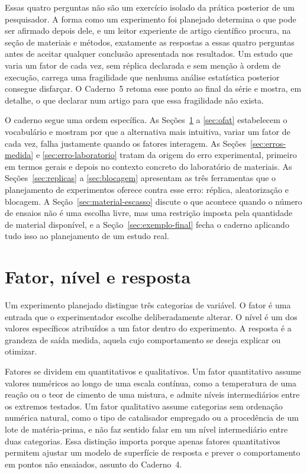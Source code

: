 \documentclass{doeapostila}
\begin{document}
Essas quatro perguntas não são um exercício isolado da prática posterior de
um pesquisador. A forma como um experimento foi planejado determina o que
pode ser afirmado depois dele, e um leitor experiente de artigo científico
procura, na seção de materiais e métodos, exatamente as respostas a essas
quatro perguntas antes de aceitar qualquer conclusão apresentada nos
resultados. Um estudo que varia um fator de cada vez, sem réplica declarada
e sem menção à ordem de execução, carrega uma fragilidade que nenhuma
análise estatística posterior consegue disfarçar. O Caderno~5 retoma esse
ponto ao final da série e mostra, em detalhe, o que declarar num artigo
para que essa fragilidade não exista.

O caderno segue uma ordem específica. As Seções~\ref{sec:fator-nivel} a
\ref{sec:ofat} estabelecem o vocabulário e mostram por que a alternativa mais
intuitiva, variar um fator de cada vez, falha justamente quando os fatores
interagem. As Seções~\ref{sec:erros-medida} e \ref{sec:erro-laboratorio}
tratam da origem do erro experimental, primeiro em termos gerais e depois no
contexto concreto do laboratório de materiais. As Seções~\ref{sec:replicas}
a \ref{sec:blocagem} apresentam as três ferramentas que o planejamento de
experimentos oferece contra esse erro: réplica, aleatorização e blocagem. A
Seção~\ref{sec:material-escasso} discute o que acontece quando o número de
ensaios não é uma escolha livre, mas uma restrição imposta pela quantidade
de material disponível, e a Seção~\ref{sec:exemplo-final} fecha o caderno
aplicando tudo isso ao planejamento de um estudo real.

\section{Fator, nível e resposta}
\label{sec:fator-nivel}

Um experimento planejado distingue três categorias de variável. O fator é
uma entrada que o experimentador escolhe deliberadamente alterar. O nível é
um dos valores específicos atribuídos a um fator dentro do experimento. A
resposta é a grandeza de saída medida, aquela cujo comportamento se deseja
explicar ou otimizar.

Fatores se dividem em quantitativos e qualitativos. Um fator quantitativo
assume valores numéricos ao longo de uma escala contínua, como a temperatura
de uma reação ou o teor de cimento de uma mistura, e admite níveis
intermediários entre os extremos testados. Um fator qualitativo assume
categorias sem ordenação numérica natural, como o tipo de catalisador
empregado ou a procedência de um lote de matéria-prima, e não faz sentido
falar em um nível intermediário entre duas categorias. Essa distinção
importa porque apenas fatores quantitativos permitem ajustar um modelo de
superfície de resposta e prever o comportamento em pontos não ensaiados,
assunto do Caderno~4.
\end{document}
